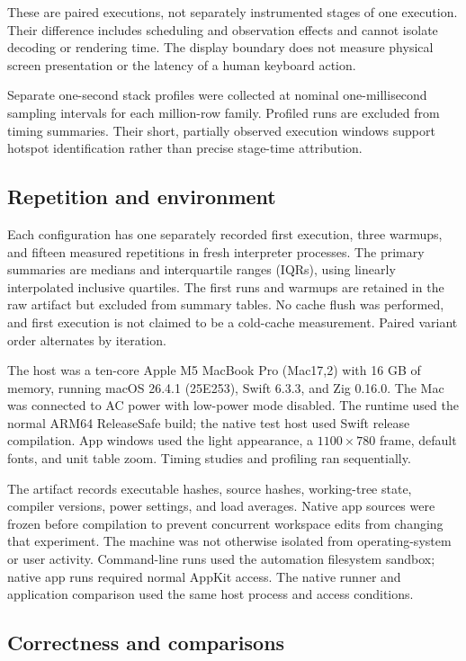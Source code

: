 \documentclass[11pt,a4paper]{article}
\begin{document}
These are paired executions, not separately instrumented stages
of one execution. Their difference includes scheduling and
observation effects and cannot isolate decoding or rendering
time. The display boundary does not measure physical screen
presentation or the latency of a human keyboard action.

Separate one-second stack profiles were collected at nominal
one-millisecond sampling intervals for each million-row family.
Profiled runs are excluded from timing summaries. Their short,
partially observed execution windows support hotspot
identification rather than precise stage-time attribution.

\subsection{Repetition and environment}

Each configuration has one separately recorded first execution,
three warmups, and fifteen measured repetitions in fresh
interpreter processes. The primary summaries are medians and
interquartile ranges (IQRs), using linearly interpolated inclusive
quartiles. The first runs and warmups are retained in the raw
artifact but excluded from summary tables. No cache flush was
performed, and first execution is not claimed to be a cold-cache
measurement. Paired variant order alternates by iteration.

The host was a ten-core Apple M5 MacBook Pro (Mac17,2) with 16 GB
of memory, running macOS 26.4.1 (25E253), Swift 6.3.3, and Zig
0.16.0. The Mac was connected to AC power with low-power mode
disabled. The runtime used the normal ARM64 ReleaseSafe build;
the native test host used Swift release compilation. App windows
used the light appearance, a $1100\times780$ frame, default fonts,
and unit table zoom. Timing studies and profiling ran
sequentially.

The artifact records executable hashes, source hashes, working-tree
state, compiler versions, power settings, and load averages.
Native app sources were frozen before compilation to prevent
concurrent workspace edits from changing that experiment. The
machine was not otherwise isolated from operating-system or user
activity. Command-line runs used the automation filesystem
sandbox; native app runs required normal AppKit access. The
native runner and application comparison used the same host
process and access conditions.

\subsection{Correctness and comparisons}
\end{document}
